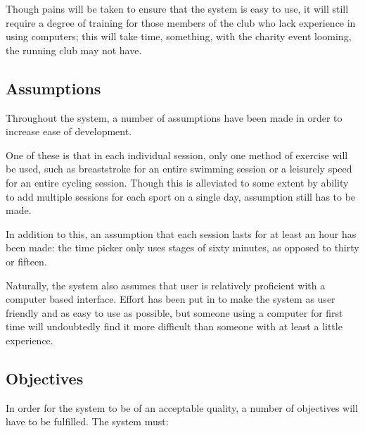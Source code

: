 \documentclass{article}[12pt,a4paper]
\begin{document}
Though pains will be taken to ensure that the system is easy to use, it will still require a degree of training for those members of the club who lack experience in using computers; this will take time, something, with the charity event looming, the running club may not have.

\subsection{Assumptions}
Throughout the system, a number of assumptions have been made in order to increase ease of development. 

One of these is that in each individual session, only one method of exercise will be used, such as breaststroke for an entire swimming session or a leisurely speed for an entire cycling session. Though this is alleviated to some extent by ability to add multiple sessions for each sport on a single day, assumption still has to be made. 

In addition to this, an assumption that each session lasts for at least an hour has been made: the time picker only uses stages of sixty minutes, as opposed to thirty or fifteen.

Naturally, the system also assumes that user is relatively proficient with a computer based interface. Effort has been put in to make the system as user friendly and as easy to use as possible, but someone using a computer for first time will undoubtedly find it more difficult than someone with at least a little experience.

\subsection{Objectives}
In order for the system to be of an acceptable quality, a number of objectives will have to be fulfilled. The system must:
\end{document}
